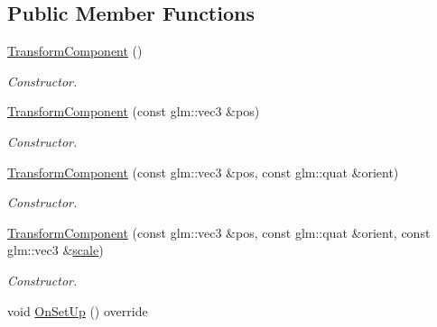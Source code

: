 \subsection*{Public Member Functions}
\begin{DoxyCompactItemize}
\item 
\hypertarget{class_transform_component_ace1cf2d7d2a7468e9cb3eb0ce382f446}{\hyperlink{class_transform_component_ace1cf2d7d2a7468e9cb3eb0ce382f446}{Transform\+Component} ()}\label{class_transform_component_ace1cf2d7d2a7468e9cb3eb0ce382f446}

\begin{DoxyCompactList}\small\item\em Constructor. \end{DoxyCompactList}\item 
\hypertarget{class_transform_component_a01037615eda19c3bbb51c99094839574}{\hyperlink{class_transform_component_a01037615eda19c3bbb51c99094839574}{Transform\+Component} (const glm\+::vec3 \&pos)}\label{class_transform_component_a01037615eda19c3bbb51c99094839574}

\begin{DoxyCompactList}\small\item\em Constructor. \end{DoxyCompactList}\item 
\hypertarget{class_transform_component_a05ce9d2b5a350a5d8d67ce6b323818d4}{\hyperlink{class_transform_component_a05ce9d2b5a350a5d8d67ce6b323818d4}{Transform\+Component} (const glm\+::vec3 \&pos, const glm\+::quat \&orient)}\label{class_transform_component_a05ce9d2b5a350a5d8d67ce6b323818d4}

\begin{DoxyCompactList}\small\item\em Constructor. \end{DoxyCompactList}\item 
\hypertarget{class_transform_component_aa823162adc73870484409dcdb8cc95f3}{\hyperlink{class_transform_component_aa823162adc73870484409dcdb8cc95f3}{Transform\+Component} (const glm\+::vec3 \&pos, const glm\+::quat \&orient, const glm\+::vec3 \&\hyperlink{class_transform_component_a759c702f0602108614a0a00503c2320a}{scale})}\label{class_transform_component_aa823162adc73870484409dcdb8cc95f3}

\begin{DoxyCompactList}\small\item\em Constructor. \end{DoxyCompactList}\item 
\hypertarget{class_transform_component_a8c09c13555d6d480ef0e3af9e3231ae2}{void \hyperlink{class_transform_component_a8c09c13555d6d480ef0e3af9e3231ae2}{On\+Set\+Up} () override}\label{class_transform_component_a8c09c13555d6d480ef0e3af9e3231ae2}


\end{DoxyCompactItemize}
